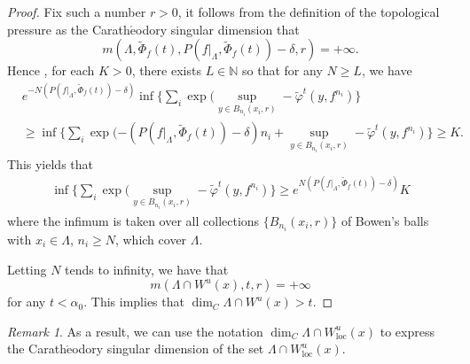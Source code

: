 \documentclass[11pt,a4paper]{amsart}
\theoremstyle{plain}
\theoremstyle{remark}
\newtheorem{Rem}[Thm]{Remark}
\begin{document}
\begin{proof}
		Fix such a number $r>0$, it follows from the definition of the topological pressure as the Carath$\acute{\text{e}}$odory singular dimension that
		$$m(\Lambda,\tilde{\Phi}_{f}(t),P(f|_\Lambda,\tilde{\Phi}_{f}(t))-\delta,r)=+\infty.$$
		Hence , for each $K>0$, there exists $L\in \mathbb{N}$ so that for any $N\geq L$, we have
		\begin{align*}
			&e^{-N(P(f|_{\Lambda},\tilde{\Phi}_{f}(t))-\delta)}\inf\{\sum_{i}\exp(\sup_{y\in B_{n_{i}}(x_{i},r)}-\tilde{\varphi}^{t}(y,f^{n_{i}})\}\\
			&\geq \inf\{\sum_{i}\exp(-(P(f|_{\Lambda},\tilde{\Phi}_{f}(t))-\delta)n_{i}+\sup_{y\in B_{n_{i}}(x_{i},r)}-\tilde{\varphi}^{t}(y,f^{n_{i}})\}\geq K.
		\end{align*}
		This yields that
		\begin{align*}
			\inf\{\sum_{i}\exp(\sup_{y\in B_{n_{i}}(x_{i},r)}-\tilde{\varphi}^{t}(y,f^{n_{i}})\}\geq e^{N(P(f|_{\Lambda},\tilde{\Phi}_{f}(t))-\delta)}K
		\end{align*}
		where the infimum is taken over all collections $\{B_{n_{i}}(x_{i},r)\}$ of Bowen's balls with $x_{i}\in \Lambda$, $n_{i}\geq N$, which cover $\Lambda$.
		
		Letting $N$ tends to infinity, we have that
		$$m(\Lambda\cap W^{u}(x),t,r)=+\infty$$
		for any $t<\alpha_{0}$. This implies that  $\dim_{C}\Lambda\cap W^{u}(x)> t$.
	\end{proof}
	
	
	\begin{Rem}
		As a result, we can use the notation $\dim_{C}\Lambda\cap W^{u}_{\text{loc}}(x)$ to express the Carath$\acute{\text{e}}$odory singular dimension of the set $\Lambda\cap W^{u}_{\text{loc}}(x)$.
	\end{Rem}
	\fi
	
\end{document}
